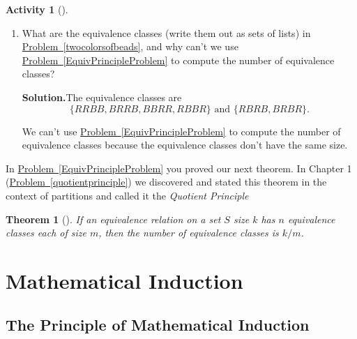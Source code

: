 \documentclass[10pt,]{book}
\theoremstyle{plain}
\newtheorem{theorem}{Theorem}[section]
\theoremstyle{definition}
\newtheorem{activity}[project]{Activity}
\numberwithin{equation}{chapter}
\begin{document}
\begin{activity}[]
\begin{enumerate}[label=(\alph*)]
~\par
\item What are the equivalence classes (write them out as sets of lists) in \hyperref[twocolorsofbeads]{Problem~\ref{twocolorsofbeads}}, and why can't we use \hyperref[EquivPrincipleProblem]{Problem~\ref{EquivPrincipleProblem}} to compute the number of equivalence classes?%
\par\medskip\noindent%
\textbf{Solution.}\quad The equivalence classes are%
\begin{equation*}
\{RRBB, BRRB, BBRR, RBBR\}
\mbox{~and~} 
\{RBRB, BRBR\}.
\end{equation*}
%
\par
We can't use \hyperref[EquivPrincipleProblem]{Problem~\ref{EquivPrincipleProblem}} to compute the number of equivalence classes because the equivalence classes don't have the same size.%

\end{enumerate}
\end{activity}
In \hyperref[EquivPrincipleProblem]{Problem~\ref{EquivPrincipleProblem}} you proved our next theorem. In Chapter 1 (\hyperref[quotientprinciple]{Problem~\ref{quotientprinciple}}) we discovered and stated this theorem in the context of partitions and called it the \emph{Quotient Principle}%
\begin{theorem}[{}]\label{theorem-11}
If an equivalence relation on a set \(S\) size \(k\) has \(n\) equivalence classes each of size \(m\), then the number of equivalence classes is \(k/m\).%
\end{theorem}
\typeout{************************************************}
\typeout{************************************************}
\chapter[{Mathematical Induction}]{Mathematical Induction}\label{Induction}
\typeout{************************************************}
\typeout{************************************************}
\section[{The Principle of Mathematical Induction}]{The Principle of Mathematical Induction}\label{section-23}
\typeout{************************************************}
\typeout{************************************************}
\end{document}
